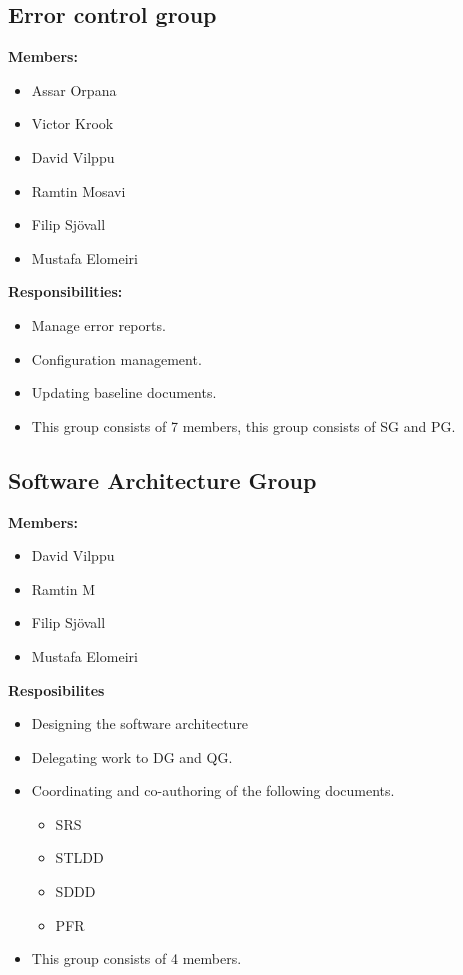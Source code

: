 \documentclass{article}
\begin{document}
    \subsection{Error control group}
        \textbf{Members: }
        \begin{itemize}
            \item Assar Orpana
            \item Victor Krook
            \item David Vilppu
            \item Ramtin Mosavi
            \item Filip Sjövall
            \item Mustafa Elomeiri
        \end{itemize}
        \textbf{Responsibilities: }
        \begin{itemize}
            \item Manage error reports. 
            \item Configuration management. 
            \item Updating baseline documents.  
            \item This group consists of 7 members, this group consists of SG and PG.
        \end{itemize}
    
    \subsection{Software Architecture Group}
        \textbf{Members: }
        \begin{itemize}
            \item David Vilppu
            \item Ramtin M
            \item Filip Sjövall
            \item Mustafa Elomeiri
        \end{itemize}
        \textbf{Resposibilites}
        \begin{itemize}
            \item Designing the software architecture
            \item Delegating work to DG and QG.
            \item Coordinating and co-authoring of the following documents.
                \begin{itemize}
                    \item SRS
                    \item STLDD
                    \item SDDD
                    \item PFR
                \end{itemize} 
            \item This group consists of 4 members.
        \end{itemize}
 
\end{document}
